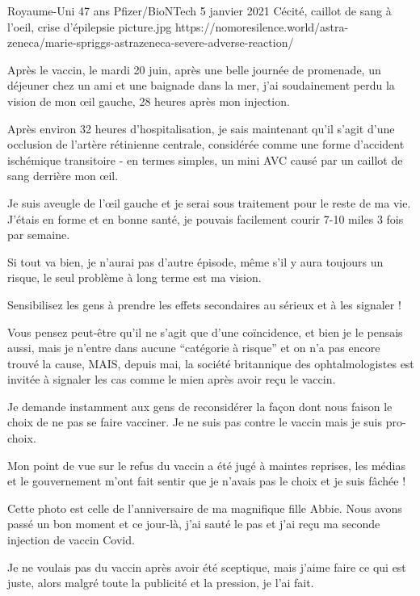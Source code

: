           {Royaume-Uni}
          {47 ans}
          {Pfizer/BioNTech}
          {5 janvier 2021}
          {Cécité, caillot de sang à l'oeil, crise d'épilepsie}
          {picture.jpg}
          {https://nomoresilence.world/astra-zeneca/marie-spriggs-astrazeneca-severe-adverse-reaction/}
          {

Après le vaccin, le mardi 20 juin, après une belle journée de promenade, un
déjeuner chez un ami et une baignade dans la mer, j'ai soudainement perdu la
vision de mon œil gauche, 28 heures après mon injection.

Après environ 32 heures d'hospitalisation, je sais maintenant qu'il s'agit d'une
occlusion de l'artère rétinienne centrale, considérée comme une forme d'accident
ischémique transitoire - en termes simples, un mini AVC causé par un caillot de
sang derrière mon œil.

Je suis aveugle de l'œil gauche et je serai sous traitement pour le reste de ma
vie. J'étais en forme et en bonne santé, je pouvais facilement courir 7-10 miles
3 fois par semaine.

Si tout va bien, je n'aurai pas d'autre épisode, même s'il y aura toujours un
risque, le seul problème à long terme est ma vision.

Sensibilisez les gens à prendre les effets secondaires au sérieux et à les
signaler !

Vous pensez peut-être qu'il ne s'agit que d'une coïncidence, et bien je le
pensais aussi, mais je n'entre dans aucune “catégorie à risque” et on n'a pas
encore trouvé la cause, MAIS, depuis mai, la société britannique des
ophtalmologistes est invitée à signaler les cas comme le mien après avoir reçu
le vaccin.

Je demande instamment aux gens de reconsidérer la façon dont nous faison le
choix de ne pas se faire vacciner. Je ne suis pas contre le vaccin mais je suis
pro-choix.

Mon point de vue sur le refus du vaccin a été jugé à maintes reprises, les
médias et le gouvernement m'ont fait sentir que je n'avais pas le choix et je
suis fâchée !

Cette photo est celle de l'anniversaire de ma magnifique fille Abbie. Nous avons
passé un bon moment et ce jour-là, j'ai sauté le pas et j'ai reçu ma seconde
injection de vaccin Covid.

Je ne voulais pas du vaccin après avoir été sceptique, mais j'aime faire ce qui
est juste, alors malgré toute la publicité et la pression, je l'ai fait.

}
